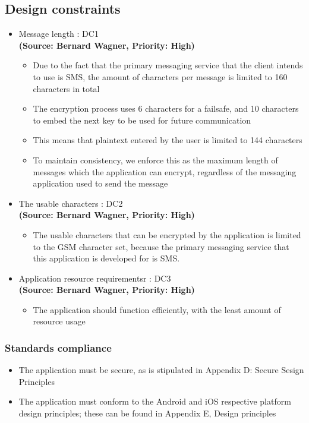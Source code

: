 \subsection{Design constraints}
\begin{itemize}
\item{Message length : DC1}\\
\textbf{(Source: Bernard Wagner, Priority: High)}
\begin{itemize}
\item Due to the fact that the primary messaging service that the client intends to use is SMS, the amount of characters per message is limited to 160 characters in total
\item The encryption process uses 6 characters for a failsafe, and 10 characters to embed the next key to be used for future communication
\item This means that plaintext entered by the user is limited to 144 characters
\item To maintain consistency, we enforce this as the maximum length of messages which the application can encrypt, regardless of the messaging application used to send the message
\end{itemize}
\item{The usable characters : DC2}\\
\textbf{(Source: Bernard Wagner, Priority: High)}
\begin{itemize}
\item The usable characters that can be encrypted by the application is limited to the GSM character set, because the primary messaging service that this application is developed for is SMS.
\end{itemize}
\item{Application resource requirementsr : DC3}\\
\textbf{(Source: Bernard Wagner, Priority: High)}
\begin{itemize}
\item The application should function efficiently, with the least amount of resource usage
\end{itemize}
\end{itemize}
\subsubsection{Standards compliance}
\begin{itemize}
\item The application must be secure, as is stipulated in Appendix D: Secure Sesign Principles
\item The application must conform to the Android and iOS respective platform design principles; these can be found in Appendix E, Design principles
\end{itemize}

